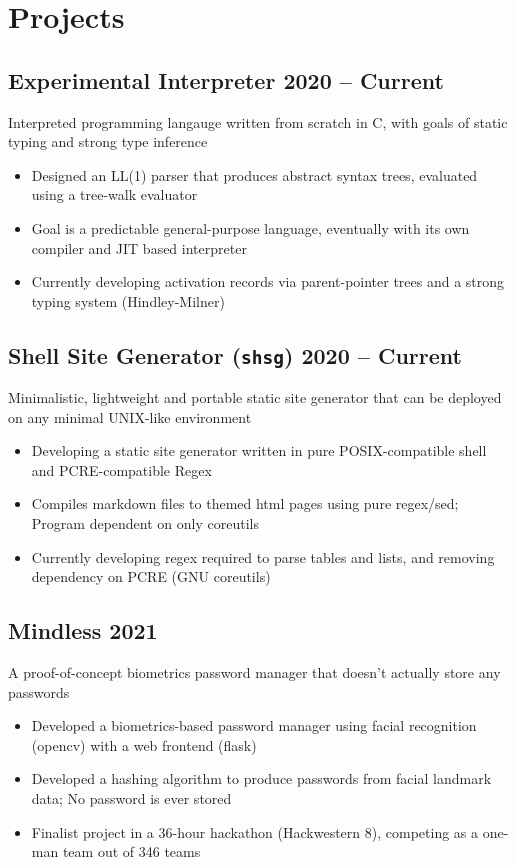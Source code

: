\documentclass[9pt]{article}
\begin{document}
\section*{Projects}

\subsection{Experimental Interpreter \hfill \normalsize\textnormal{2020 -- Current}}
Interpreted programming langauge written from scratch in C, with goals of static typing and strong type inference
\vspace{-0.5em}
\begin{itemize}
    \item Designed an LL(1) parser that produces abstract syntax trees, evaluated using a tree-walk evaluator 
    \item Goal is a predictable general-purpose language, eventually with its own compiler and JIT based interpreter 
    \item Currently developing activation records via parent-pointer trees and a strong typing system (Hindley-Milner)
\end{itemize}

\subsection{Shell Site Generator (\texttt{shsg}) \hfill \normalsize\textnormal{2020 -- Current}}
    Minimalistic, lightweight and portable static site generator that can be deployed on any minimal UNIX-like environment
\vspace{-0.5em}
\begin{itemize}
    \item Developing a static site generator written in pure POSIX-compatible shell and PCRE-compatible Regex
    \item Compiles markdown files to themed html pages using pure regex/sed; Program dependent on only coreutils 
    \item Currently developing regex required to parse tables and lists, and removing dependency on PCRE (GNU coreutils)
\end{itemize}

\subsection{Mindless \hfill \normalsize\textnormal{2021}}
    A proof-of-concept biometrics password manager that doesn't actually store any passwords
\vspace{-0.5em}
\begin{itemize}
    \item Developed a biometrics-based password manager using facial recognition (opencv) with a web frontend (flask)
    \item Developed a hashing algorithm to produce passwords from facial landmark data; No password is ever stored
    \item Finalist project in a 36-hour hackathon (Hackwestern 8), competing as a one-man team out of 346 teams
\end{itemize}
\end{document}
